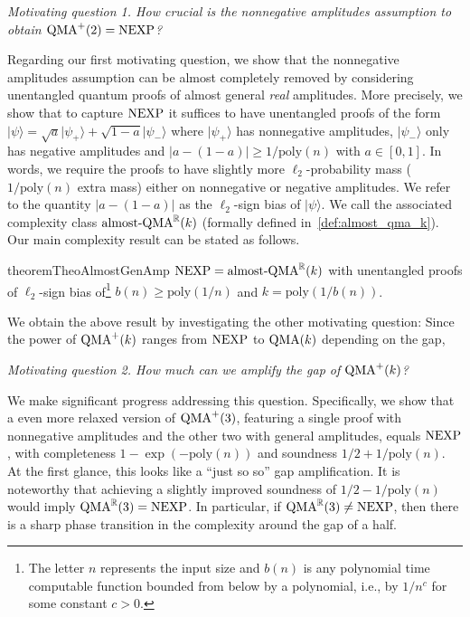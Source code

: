 \documentclass[10pt,a4paper]{article}
\theoremstyle{remark}
\newcommand{\ie}{i.e.,\xspace}
\newcommand{\R}{{\mathbb R}}
\newcommand{\abs}[1]{\ensuremath{\left\lvert #1 \right\rvert}}
\newcommand{\poly}{{\mathrm{poly}}}
\newcommand{\1}[1]{\mathds{1}{[#1]}}
\newcommand{\ket}[1]{\lvert #1\rangle}
\newcommand{\QMA}{\textup{QMA}}
\newcommand{\NEXP}{\textup{NEXP}}
\numberwithin{equation}{section}
\begin{document}
\begin{center}
{\it  Motivating question 1. How crucial is the nonnegative amplitudes assumption to obtain $\QMA^+(2)=\NEXP$?}
\end{center}
Regarding our first motivating question, we show that the nonnegative amplitudes assumption can be almost
completely removed by considering unentangled quantum proofs of almost general \emph{real} amplitudes.
%
More precisely, we show that to capture $\NEXP$ it suffices to have unentangled proofs of the form
$\ket{\psi} = \sqrt{a} \ket{\psi_+} + \sqrt{1-a} \ket{\psi_{-}}$ where
$\ket{\psi_+}$ has nonnegative amplitudes, $\ket{\psi_{-}}$ only has
negative amplitudes and $\abs{a-(1-a)} \ge 1/\poly(n)$ with $a \in [0,1]$.
%
In words, we require the proofs to have slightly more $\ell_2$-probability mass ($1/\poly(n)$ extra mass) either on
nonnegative or negative amplitudes.
%
We refer to the quantity $\abs{a-(1-a)}$ as the $\ell_2$-sign bias of $\ket{\psi}$.
%
We call the associated complexity class $\textup{almost-QMA}^\R(k)$ (formally defined in~\cref{def:almost_qma_k}).
Our main complexity result can be stated as follows.


\begin{restatable}{theorem}{TheoAlmostGenAmp}\label{thm:almost_gen_amp}
  $\NEXP = \textup{almost-QMA}^\R(k)$ with unentangled proofs of $\ell_2$-sign bias of\footnote{The letter $n$ represents the
  input size and $b(n)$ is any polynomial time computable function bounded from below by a polynomial, \ie by $1/n^c$ for
  some constant $c > 0$.} $b(n) \ge \poly(1/n)$ and $k=\poly(1/b(n))$.
\end{restatable}


We obtain the above result by investigating the other motivating question: Since the power of $\QMA^+(k)$
ranges from $\NEXP$ to $\QMA(k)$ depending on the gap,


\begin{center}{\it Motivating question 2.
  How much can we amplify the gap of $\QMA^+(k)$?}
\end{center}

We make significant progress addressing this question.
%
Specifically, we show that a even more relaxed version of $\QMA^+(3)$, featuring
a single proof with nonnegative amplitudes and the other two with general amplitudes,
equals $\NEXP$, with completeness $1-\exp(-\poly(n))$ and soundness $1/2+1/\poly(n)$.
%
At the first glance, this looks like a ``just so so'' gap amplification.
%
It is noteworthy that achieving a slightly improved soundness of $1/2-1/\poly(n)$ would
imply $\QMA^\R(3)=\NEXP$.
%
In particular, if $\QMA^\R(3) \ne \NEXP$, then there is a sharp phase
transition in the complexity around the gap of a half.
\end{document}
